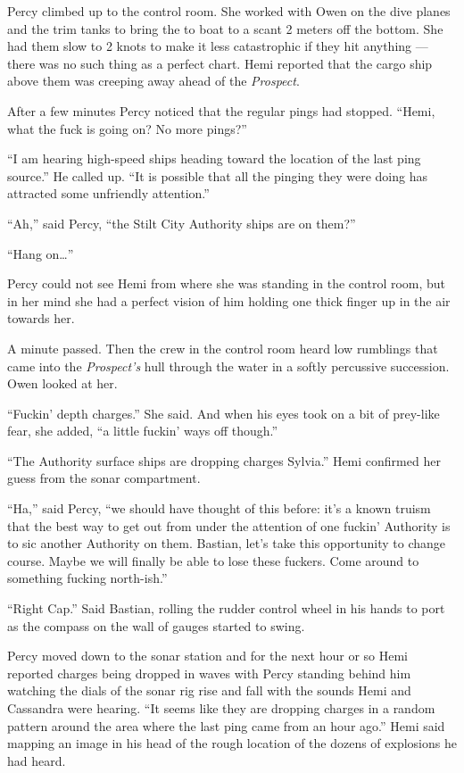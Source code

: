 \documentclass[
]{scrbook}
\begin{document}
Percy climbed up to the control room. She worked with Owen on the dive
planes and the trim tanks to bring the to boat to a scant 2 meters off
the bottom. She had them slow to 2 knots to make it less catastrophic if
they hit anything --- there was no such thing as a perfect chart. Hemi
reported that the cargo ship above them was creeping away ahead of the
\emph{Prospect}.

After a few minutes Percy noticed that the regular pings had stopped.
``Hemi, what the fuck is going on? No more pings?''

``I am hearing high-speed ships heading toward the location of the last
ping source.'' He called up. ``It is possible that all the pinging they
were doing has attracted some unfriendly attention.''

``Ah,'' said Percy, ``the Stilt City Authority ships are on them?''

``Hang on\ldots{}''

Percy could not see Hemi from where she was standing in the control
room, but in her mind she had a perfect vision of him holding one thick
finger up in the air towards her.

A minute passed. Then the crew in the control room heard low rumblings
that came into the \emph{Prospect's} hull through the water in a softly
percussive succession. Owen looked at her.

``Fuckin' depth charges.'' She said. And when his eyes took on a bit of
prey-like fear, she added, ``a little fuckin' ways off though.''

``The Authority surface ships are dropping charges Sylvia.'' Hemi
confirmed her guess from the sonar compartment.

``Ha,'' said Percy, ``we should have thought of this before: it's a
known truism that the best way to get out from under the attention of
one fuckin' Authority is to sic another Authority on them. Bastian,
let's take this opportunity to change course. Maybe we will finally be
able to lose these fuckers. Come around to something fucking
north-ish.''

``Right Cap.'' Said Bastian, rolling the rudder control wheel in his
hands to port as the compass on the wall of gauges started to swing.

Percy moved down to the sonar station and for the next hour or so Hemi
reported charges being dropped in waves with Percy standing behind him
watching the dials of the sonar rig rise and fall with the sounds Hemi
and Cassandra were hearing. ``It seems like they are dropping charges in
a random pattern around the area where the last ping came from an hour
ago.'' Hemi said mapping an image in his head of the rough location of
the dozens of explosions he had heard.
\end{document}

